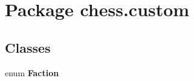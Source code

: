 \section{Package chess.\+custom}
\label{namespacechess_1_1custom}
\subsection*{Classes}
\begin{DoxyCompactItemize}
\item 
enum {\bf Faction}
\end{DoxyCompactItemize}
